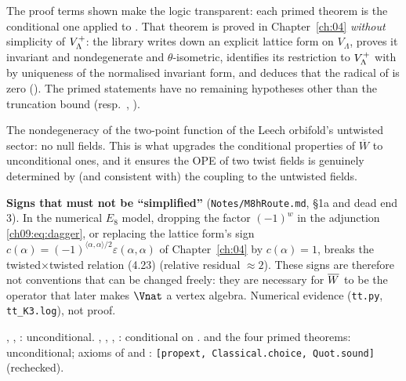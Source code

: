 \begin{dictionary}
The proof terms shown make the logic transparent: each primed theorem is the conditional one
applied to . That theorem is proved in Chapter~\ref{ch:04} \emph{without}
simplicity of $V_{\Lambda}^{+}$: the library writes down an explicit lattice form on $V_\Lambda$, proves it
invariant and nondegenerate and $\theta$-isometric, identifies its restriction to $V_{\Lambda}^{+}$ with
 by uniqueness of the normalised invariant form, and deduces that the radical of
 is zero (). The primed statements have no remaining
hypotheses other than the truncation bound  (resp.\ , ).
\end{dictionary}

\begin{physics}
The nondegeneracy of the two-point function of the Leech orbifold's untwisted sector: no null fields. This is what upgrades the conditional properties of $\overline W$ to unconditional ones, and it ensures the OPE of two twist fields is genuinely determined by (and consistent with) the coupling to the untwisted fields.
\end{physics}

\begin{warning}
\textbf{Signs that must not be ``simplified''} (\texttt{Notes/M8hRoute.md}, \S1a and dead end 3).
In the numerical $E_8$ model, dropping the factor $(-1)^w$ in the adjunction \eqref{ch09:eq:dagger},
or replacing the lattice form's sign $c(\alpha)=(-1)^{\langle\alpha,\alpha\rangle/2}\varepsilon(\alpha,\alpha)$
of Chapter~\ref{ch:04} by $c(\alpha)=1$, breaks the twisted$\times$twisted relation (4.23) (relative
residual $\approx2$). These signs are therefore not conventions that can be changed freely: they
are necessary for $\overline{W}$ to be the operator that later makes $\Vnat$ a vertex algebra.
Numerical evidence (\texttt{tt.py}, \texttt{tt\_K3.log}), not proof.
\end{warning}

\begin{status}
, , : unconditional.
, , , :
conditional on .  and the four primed theorems: unconditional;
axioms of  and : \texttt{[propext,
Classical.choice, Quot.sound]} (rechecked).
\end{status}

